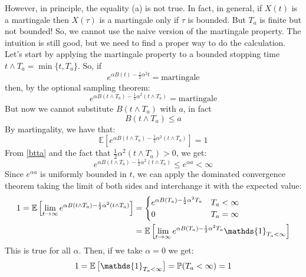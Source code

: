However, in principle, the equality (a) is not true. In fact, in general, if $X(t)$ is a martingale then $X(\tau)$ is a martingale only if $\tau$ is bounded. But $T_a$ is finite but not bounded! So, we cannot use the naive version of the martingale property. The intuition is still good, but we need to find a proper way to do the calculation. \\
Let's start by applying the martingale property to a bounded stopping time $t\wedge T_a=\min\{t,T_a\}$. So, if
\begin{equation}
    e^{\alpha B(t)-\frac{1}{2}\alpha^2 t} = \text{martingale}
\end{equation}
then, by the optional sampling theorem:
\begin{equation}
    e^{\alpha B(t\wedge T_a)-\frac{1}{2}\alpha^2 (t\wedge T_a)} = \text{martingale}
\end{equation} 
But now we cannot substitute $B(t\wedge T_a)$ with $a$, in fact 
\begin{equation}\label{btta}
    B(t\wedge T_a) \le a
\end{equation}
By martingality, we have that:
\begin{equation}
    \mathbb{E}\left[e^{\alpha B(t\wedge T_a)-\frac{1}{2}\alpha^2 (t\wedge T_a)}\right] = 1
\end{equation}
From \ref{btta} and the fact that $\frac{1}{2}\alpha^2 (t\wedge T_a) > 0$, we get:
\begin{equation}
    e^{\alpha B(t\wedge T_a)-\frac{1}{2}\alpha^2 (t\wedge T_a)} \le e^{\alpha a} < \infty
\end{equation}
Since $e^{\alpha a}$ is uniformly bounded in $t$, we can apply the dominated convergence theorem taking the limit of both sides and interchange it with the expected value:
\begin{align}
    \notag 1 = \mathbb{E}\left[\lim_{t\to\infty}e^{\alpha B(t\wedge T_a)-\frac{1}{2}\alpha^2 (t\wedge T_a)}\right] &= 
    \begin{cases}
    e^{\alpha B(T_a)-\frac{1}{2}\alpha^2 T_a} & T_a<\infty \\
    0 & T_a = \infty
    \end{cases}\\
    &=
    \mathbb{E}\left[\lim_{t\to\infty}e^{\alpha B(T_a)-\frac{1}{2}\alpha^2 T_a}\mathds{1}_{T_a<\infty}\right]
\end{align}
This is true for all $\alpha$. Then, if we take $\alpha = 0$ we get:
\begin{equation}
    1 = \mathbb{E}\left[\mathds{1}_{T_a<\infty} \right] = \Pmeas(T_a<\infty) = 1
\end{equation}
